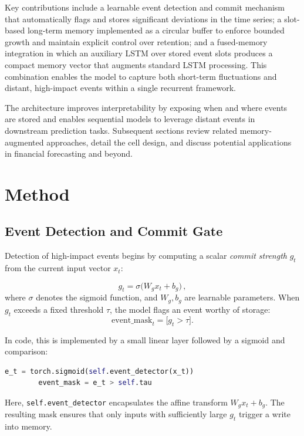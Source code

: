 \documentclass{article}
\begin{document}
	Key contributions include a learnable event detection and commit mechanism that automatically flags and stores significant deviations in the time series; a slot-based long-term memory implemented as a circular buffer to enforce bounded growth and maintain explicit control over retention; and a fused-memory integration in which an auxiliary LSTM over stored event slots produces a compact memory vector that augments standard LSTM processing. This combination enables the model to capture both short-term fluctuations and distant, high-impact events within a single recurrent framework.
	
	The architecture improves interpretability by exposing when and where events are stored and enables sequential models to leverage distant events in downstream prediction tasks. Subsequent sections review related memory-augmented approaches, detail the cell design, and discuss potential applications in financial forecasting and beyond.
	
	
	\section{Method}
	
	\subsection{Event Detection and Commit Gate}
	
	Detection of high-impact events begins by computing a scalar \emph{commit strength} \(g_t\) from the current input vector \(x_t\):
	
	\[
	g_t = \sigma\bigl(W_g x_t + b_g\bigr)\,,
	\]
	where \(\sigma\) denotes the sigmoid function, and \(W_g, b_g\) are learnable parameters.  When \(g_t\) exceeds a fixed threshold \(\tau\), the model flags an event worthy of storage:
	\[
	\text{event\_mask}_t = \bigl[g_t > \tau\bigr].
	\]
	
	In code, this is implemented by a small linear layer followed by a sigmoid and comparison:
	
	\begin{lstlisting}[language=Python, caption={Computing commit strength and boolean mask}]
		e_t = torch.sigmoid(self.event_detector(x_t))
		event_mask = e_t > self.tau
	\end{lstlisting}
	
	Here, \texttt{self.event\_detector} encapsulates the affine transform $W_g x_t + b_g$.  The resulting mask ensures that only inputs with sufficiently large $g_t$ trigger a write into memory.
	
\end{document}
